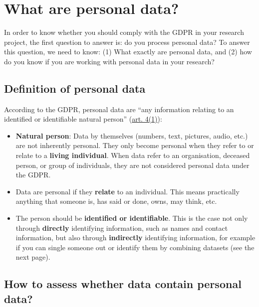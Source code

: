 \documentclass[
]{book}
\providecommand{\tightlist}{%
  \setlength{\itemsep}{0pt}\setlength{\parskip}{0pt}}
\begin{document}
\hypertarget{personal-data}{%
\chapter{What are personal data?}\label{personal-data}}

In order to know whether you should comply with the GDPR in your research
project, the first question to answer is: do you process personal data? To
answer this question, we need to know: (1) What exactly are personal data,
and (2) how do you know if you are working with personal data in your research?

\hypertarget{definition-personal-data}{%
\section{Definition of personal data}\label{definition-personal-data}}

According to the GDPR, personal data are ``any information relating to an
identified or identifiable natural person''
(\href{https://gdpr-info.eu/art-4-gdpr/}{art. 4(1)}):

\begin{itemize}
\tightlist
\item
  \textbf{Natural person}: Data by themselves (numbers, text, pictures, audio, etc.)
  are not inherently personal. They only become personal when they refer to or
  relate to a \textbf{living individual}. When data refer to an organisation,
  deceased person, or group of individuals, they are not considered personal data
  under the GDPR.
\item
  Data are personal if they \textbf{relate} to an individual. This means practically
  anything that someone is, has said or done, owns, may think, etc.
\item
  The person should be \textbf{identified or identifiable}. This is the case not
  only through \textbf{directly} identifying information, such as names and contact
  information, but also through \textbf{indirectly} identifying information, for
  example if you can single someone out or identify them by combining datasets
  (see the next page).
\end{itemize}

\hypertarget{personal-data-assess}{%
\section{How to assess whether data contain personal data?}\label{personal-data-assess}}
\end{document}
